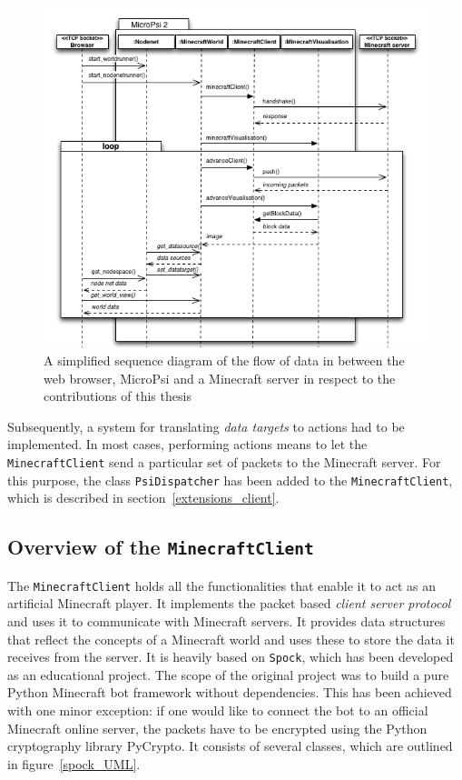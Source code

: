 \begin{figure}[h]
  \centering
    \includegraphics[width=15cm]{graphics/sequencediagram_v14}
  \caption{A simplified sequence diagram of the flow of data in between the web browser, MicroPsi and a Minecraft server in respect to the contributions of this thesis}
  \label{spock_loop}
\end{figure}

Subsequently, a system for translating \emph{data targets} to actions had to be implemented. In most cases, performing actions means to let the \texttt{MinecraftClient} send a particular set of packets to the Minecraft server. For this purpose, the class \texttt{PsiDispatcher} has been added to the \texttt{MinecraftClient}, which is described in section~\ref{extensions_client}.


        \subsection{Overview of the \texttt{MinecraftClient}}
The \texttt{MinecraftClient} holds all the functionalities that enable it to act as an artificial Minecraft player. It implements the packet based \emph{client server protocol} and uses it to communicate with Minecraft servers. It provides data structures that reflect the concepts of a Minecraft world and uses these to store the data it receives from the server. It is heavily based on \texttt{Spock}, which has been developed as an educational project. The scope of the original project was to build a pure Python Minecraft bot framework without dependencies. This has been achieved with one minor exception: if one would like to connect the bot to an official Minecraft online server, the packets have to be encrypted using the Python cryptography library PyCrypto. It consists of several classes, which are outlined in figure~\ref{spock_UML}.

